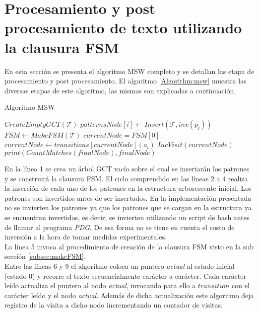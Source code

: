 \section{Procesamiento y post procesamiento de texto utilizando la clausura FSM}
\label{sec:Procesamiento_FSM}
En esta sección se presenta el algoritmo MSW completo y se detallan las etapa de procesamiento y post procesamiento.
El algoritmo \ref{Algorithm:msw} muestra las diversas etapas de este algoritmo, las mismas son explicadas a continuación.\\
\begin{algorithm}[h]
\small
\caption{Algoritmo MSW}
\label{Algorithm:msw}
\begin{algorithmic}[1]
\State $CreateEmptyGCT(\mathcal{T})$
	\State $patternsNode[i] \gets Insert(\mathcal{T}, inv(p_{i}))$
\EndFor
\State $FSM \gets MakeFSM(\mathcal{T})$
\State $currentNode = FSM[0]$
	\State $currentNode \gets transitions[currentNode](a_{i})$
	\State $IncVisit(currentNode)$
\EndFor
{}
	\State $print(CountMatches(finalNode),finalNode)$
\EndFor
\Statex
\end{algorithmic}
  \vspace{-0.4cm}%
\end{algorithm}
En la línea 1 se crea un árbol GCT vacío sobre el cual se insertarán los patrones y se construirá la clausura FSM.
El ciclo comprendido en las líneas 2 a 4 realiza la inserción de cada uno de los patrones en la estructura arborescente inicial. Los patrones son invertidos antes de ser insertados. En la implementación presentada no se invierten los patrones ya que los patrones que se cargan en la estructura ya se encuentran invertidos, es decir, se invierten utilizando un script de bash antes de llamar al programa \emph{PDG}. De esa forma no se tiene en cuenta el costo de inversión a la hora de tomar medidas experimentales.\\
La línea 5 invoca al procedimiento de creación de la clausura FSM visto en la sub sección \ref{subsec:makeFSM}. \\
Entre las líneas 6 y 9 el algoritmo coloca un puntero \emph{actual} al estado inicial (estado 0) y recorre el texto secuencialmente carácter a carácter. Cada carácter leído actualiza el puntero al nodo \emph{actual}, invocando para ello a $transition$ con el carácter leído y el nodo \emph{actual}. Además de dicha actualización este algoritmo deja registro de la visita a dicho nodo incrementando un contador de visitas.\\
